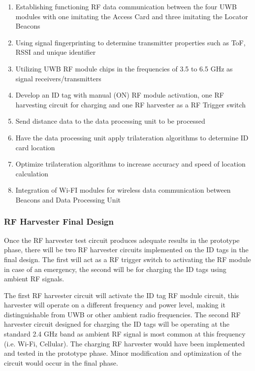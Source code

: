 \begin{enumerate}
    \item Establishing functioning RF data communication between the four UWB modules with one imitating the Access Card and three imitating the Locator Beacons
    \item Using signal fingerprinting to determine transmitter properties such as ToF, RSSI and unique identifier
    \item Utilizing UWB RF module chips in the frequencies of 3.5 to 6.5 GHz as signal receivers/transmitters
    \item Develop an ID tag with manual (ON) RF module activation, one RF harvesting circuit for charging and one RF harvester as a RF Trigger switch
    \item Send distance data to the data processing unit to be processed
    \item Have the data processing unit apply trilateration algorithms to determine ID card location
    \item Optimize trilateration algorithms to increase accuracy and speed of location calculation
    \item Integration of Wi-FI modules for wireless data communication between Beacons and Data Processing Unit
\end{enumerate}

\break
\subsubsection{RF Harvester Final Design}
Once the RF harvester test circuit produces adequate results in the prototype phase, there will be two RF harvester circuits implemented on the ID tags in the final design. The first will act as a RF trigger switch to activating the RF module in case of an emergency, the second will be for charging the ID tags using ambient RF signals.

\bigskip
The first RF harvester circuit will activate the ID tag RF module circuit, this harvester will operate on a different frequency and power level, making it distinguishable from UWB or other ambient radio frequencies. The second RF harvester circuit designed for charging the ID tags will be operating at the standard 2.4 GHz band as ambient RF signal is most common at this frequency (i.e. Wi-Fi, Cellular). The charging RF harvester would have been implemented and tested in the prototype phase. Minor modification and optimization of the circuit would occur in the final phase.

